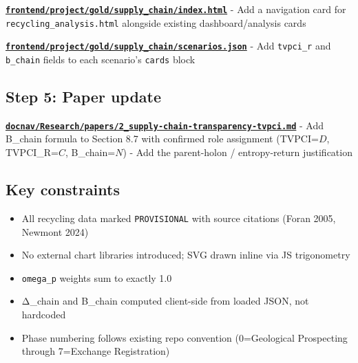 \documentclass[
  11pt,
]{article}
\providecommand{\tightlist}{%
  \setlength{\itemsep}{0pt}\setlength{\parskip}{0pt}}
\begin{document}
\textbf{\href{frontend/project/gold/supply_chain/index.html}{\texttt{frontend/project/gold/supply\_chain/index.html}}}
- Add a navigation card for \texttt{recycling\_analysis.html} alongside
existing dashboard/analysis cards

\textbf{\href{frontend/project/gold/supply_chain/scenarios.json}{\texttt{frontend/project/gold/supply\_chain/scenarios.json}}}
- Add \texttt{tvpci\_r} and \texttt{b\_chain} fields to each scenario's
\texttt{cards} block

\subsection{Step 5: Paper update}\label{step-5-paper-update}

\textbf{\href{docnav/Research/papers/2_supply-chain-transparency-tvpci.md}{\texttt{docnav/Research/papers/2\_supply-chain-transparency-tvpci.md}}}
- Add B\_chain formula to Section 8.7 with confirmed role assignment
(TVPCI=\(D\), TVPCI\_R=\(C\), B\_chain=\(N\)) - Add the parent-holon /
entropy-return justification

\subsection{Key constraints}\label{key-constraints}

\begin{itemize}
\tightlist
\item
  All recycling data marked \texttt{PROVISIONAL} with source citations
  (Foran 2005, Newmont 2024)
\item
  No external chart libraries introduced; SVG drawn inline via JS
  trigonometry
\item
  \texttt{omega\_p} weights sum to exactly 1.0
\item
  Δ\_chain and B\_chain computed client-side from loaded JSON, not
  hardcoded
\item
  Phase numbering follows existing repo convention (0=Geological
  Prospecting through 7=Exchange Registration)
\end{itemize}
\end{document}
